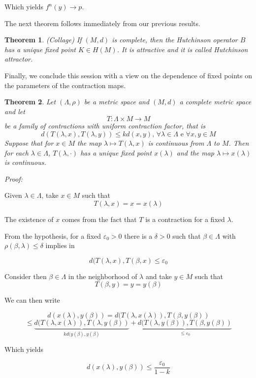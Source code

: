 \documentclass[a4paper]{article}
\theoremstyle{plain}
\newtheorem{theorem}{Theorem}[section] %
\theoremstyle{definition}
\begin{document}
Which yields $f^n(y) \rightarrow p$.

\qedsymbol

The next theorem follows immediately from our previous results.

\begin{theorem}
    (Collage) If $(M,d)$ is complete, then the Hutchinson operator $B$ has a unique fixed point $K \in H(M)$. It is attractive and it is called Hutchinson attractor.
\end{theorem}

Finally, we conclude this session with a view on the dependence of fixed points on the parameters of the contraction maps.
\begin{theorem}
    Let $(\Lambda, \rho)$ be a metric space and $(M,d)$ a complete metric space and let
    $$ T : \Lambda \times M \rightarrow M$$
    be a family of contractions with uniform contraction factor, that is
    $$d(T(\lambda,x), T(\lambda,y) ) \le k d (x,y) \mbox{,     } \forall \lambda \in \Lambda \mbox{   e  } \forall x,y \in M$$
    Suppose that for $x\in M$ the map $\lambda \mapsto T(\lambda, x)$ is continuous from $\Lambda$ to $M$. Then for each $\lambda \in \Lambda$, $T(\lambda, \cdot)$ has a unique fixed point $x(\lambda)$ and the map $\lambda \mapsto x(\lambda)$ is continuous.
\end{theorem}

\textit{Proof: }

Given $\lambda\in\Lambda$, take $x\in M$ such that
$$T(\lambda, x) = x = x(\lambda)$$

The existence of $x$ comes from the fact that $T$ is a contraction for a fixed $\lambda$.

From the hypothesis, for a fixed $\varepsilon_0>0$ there is a $\delta>0$ such that $\beta\in\Lambda$ with $\rho(\beta,\lambda) \le \delta$ implies in

$$d(T(\lambda,x),T(\beta,x) \le \varepsilon_0$$

Consider then $\beta\in \Lambda$ in the neighborhood of $\lambda $ and take $y\in M$ such that 
$$T(\beta, y) = y = y(\beta)$$

We can then write

$$d(x(\lambda),y(\beta)) = d(T(\lambda, x(\lambda)), T(\beta, y(\beta))$$
$$\le \underbrace{d(T(\lambda, x(\lambda)), T(\lambda, y(\beta))}_{k d(y(\beta),y(\beta)} +\underbrace{d(T(\lambda, y(\beta)), T(\beta, y(\beta))}_{\le \varepsilon_0} 
$$

Which yields

$$
d(x(\lambda),y(\beta)) \le \frac{\varepsilon_0}{1 - k}
$$
\end{document}
